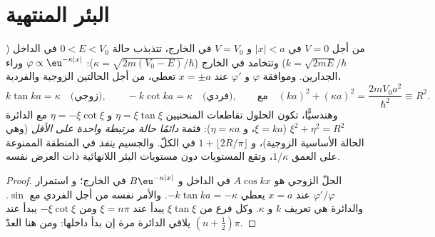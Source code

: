 \section{البئر المنتهية}

\begin{proposition}\label{prop:b2:potential-wells-tunneling:finite}
من أجل $V = 0$ في $|x| < a$ و $V = V_0$ في الخارج، تتذبذب حالة $0 < E < V_0$
في الداخل ($k = \sqrt{2mE}/\hbar$) وتتخامد في الخارج ($\kappa =
\sqrt{2m(V_0 - E)}/\hbar$): $\varphi \propto \eu^{-\kappa|x|}$ وراء الجدارين.
وموافقة $\varphi$ و $\varphi'$ عند $x = \pm a$ تعطي، من أجل الحالتين الزوجية والفردية،
\[
k\tan ka = \kappa \quad\text{(زوجي)}, \qquad
-k\cot ka = \kappa \quad\text{(فردي)}, \qquad\text{مع}\quad
(ka)^2 + (\kappa a)^2 = \frac{2mV_0a^2}{\hbar^2} \equiv R^2 .
\]
وهندسيًّا، تكون الحلول تقاطعات المنحنيين $\eta =
\xi\tan\xi$ و $\eta = -\xi\cot\xi$ مع الدائرة $\xi^2 + \eta^2 = R^2$
($\xi = ka$، و $\eta = \kappa a$): فثمة \emph{دائمًا حالة مرتبطة واحدة
على الأقل} (وهي الحالة الأساسية الزوجية)، و $1 + \lfloor 2R/\pi\rfloor$ في الكلّ.
والجسيم \emph{ينفذ} في المنطقة الممنوعة على العمق
$1/\kappa$، وتقع المستويات دون مستويات البئر اللانهائية ذات
العرض نفسه.
\end{proposition}

\begin{proof}
الحلّ الزوجي هو $A\cos kx$ في الداخل و $B\eu^{-\kappa|x|}$ في الخارج؛ و
استمرار $\varphi'/\varphi$ عند $x = a$ يعطي $-k\tan ka = -\kappa$. والأمر
نفسه من أجل الفردي مع $\sin$. والدائرة هي تعريف $k$ و
$\kappa$. وكل فرع من $\xi\tan\xi$ يبدأ عند $\xi = n\pi$ ومن
$-\xi\cot\xi$ يبدأ عند $(n + \tfrac12)\pi$ يلاقي الدائرة مرة إن
بدأ داخلها: ومن هنا العدّ.
\end{proof}

